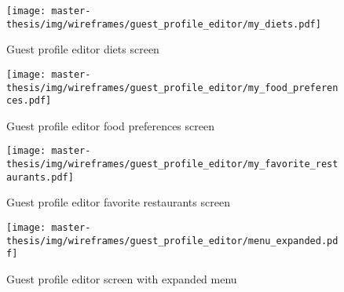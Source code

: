 \begin{figure}[h]
  \centering
  \texttt{[image: master-thesis/img/wireframes/guest\_profile\_editor/my\_diets.pdf]}
  \caption{Guest profile editor diets screen}
\end{figure}

\begin{figure}[h]
  \centering
  \texttt{[image: master-thesis/img/wireframes/guest\_profile\_editor/my\_food\_preferences.pdf]}
  \caption{Guest profile editor food preferences screen}
\end{figure}

\begin{figure}[h]
  \centering
  \texttt{[image: master-thesis/img/wireframes/guest\_profile\_editor/my\_favorite\_restaurants.pdf]}
  \caption{Guest profile editor favorite restaurants screen}
\end{figure}

\begin{figure}[h]
  \centering
  \texttt{[image: master-thesis/img/wireframes/guest\_profile\_editor/menu\_expanded.pdf]}
  \caption{Guest profile editor screen with expanded menu}
\end{figure}

\listoftodos